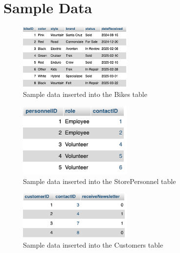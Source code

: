 \documentclass{article}
\begin{document}
\vspace{0.5cm}

\section{Sample Data}

\begin{figure}[H]
    \centering
    \includegraphics[width=0.5\textwidth]{Bikes.png}
    \caption{Sample data inserted into the Bikes table}
    \label{fig:Bikes}
\end{figure}

\begin{figure}[H]
    \centering
    \includegraphics[width=0.5\textwidth]{StorePersonnel.png}
    \caption{Sample data inserted into the StorePersonnel table}
    \label{fig:StorePersonnel}
\end{figure}

\begin{figure}[H]
    \centering
    \includegraphics[width=0.5\textwidth]{Customers.png}
    \caption{Sample data inserted into the Customers table}
    \label{fig:Customers}
\end{figure}
\end{document}
